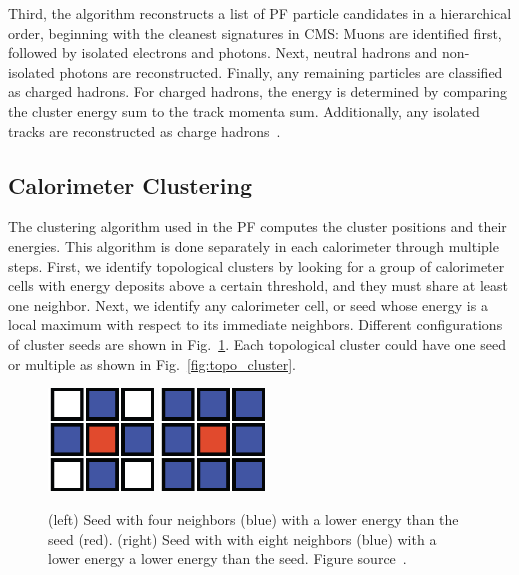 Third, the algorithm reconstructs a list of PF particle candidates in a hierarchical order, beginning with the cleanest signatures in CMS: Muons are identified first, followed by isolated electrons and photons. Next, neutral hadrons and non-isolated photons are reconstructed.
Finally, any remaining particles are classified as charged hadrons.
For charged hadrons, the energy is determined by comparing the cluster energy sum to the track momenta sum.
Additionally, any isolated tracks are reconstructed as charge hadrons~\cite{PF_workshop}.

\subsection{Calorimeter Clustering}
\label{subsec:clustering}
The clustering algorithm used in the PF computes the cluster positions and their energies.
This algorithm is done separately in each calorimeter through multiple steps.
First, we identify topological clusters by looking for a group of calorimeter cells with energy deposits above a certain threshold, and they must share at least one neighbor.
Next, we identify any calorimeter cell, or seed whose energy is a local maximum with respect to its immediate neighbors.
Different configurations of cluster seeds are shown in Fig.~\ref{fig:seeds}.
Each topological cluster could have one seed or multiple as shown in Fig.~\ref{fig:topo_cluster}.

\begin{figure}[t!]
\centering
\includegraphics[width=0.25\textwidth]{figures/seed_4neighbours.png}
\includegraphics[width=0.25\textwidth]{figures/seed_8neighbours.png}
\caption[Types of cluster seed]
        {(left) Seed with four neighbors (blue) with a lower energy than the seed (red).
          (right) Seed with with eight neighbors (blue) with a lower energy a lower energy than the seed.
          Figure source~\cite{Clustering}.}
\label{fig:seeds}
\end{figure}

